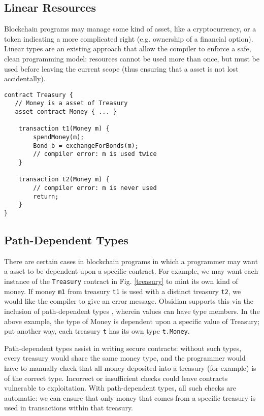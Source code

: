 \documentclass[sigplan,10pt,review]{acmart}\settopmatter{printfolios=true}
\begin{document}
\subsection{Linear Resources}

Blockchain programs may manage some kind of asset, like a cryptocurrency, or a token
indicating a more complicated right (e.g. ownership of a financial option). Linear types \cite{Wadler} are an existing approach that allow the compiler to
enforce a safe, clean programming model: resources cannot be used more than once, but must be 
used before leaving the current scope (thus ensuring that a asset is not lost accidentally).

\begin{lstlisting}[caption={Linear resources in Obsidian}, captionpos = b, label = treasury]
contract Treasury {
   // Money is a asset of Treasury
   asset contract Money { ... }

    transaction t1(Money m) {
        spendMoney(m);
        Bond b = exchangeForBonds(m);
        // compiler error: m is used twice
    }

    transaction t2(Money m) {
        // compiler error: m is never used
        return;
    }
}
\end{lstlisting}

\subsection{Path-Dependent Types}

There are certain cases in blockchain programs in which a programmer may want a asset to
be dependent upon a specific contract. For example, we may want each instance of the 
\texttt{\small{Treasury}} contract in Fig. \ref{treasury} to mint its own kind of money. If money \texttt{\small{m1}} from treasury \texttt{\small{t1}} is used with a distinct treasury \texttt{\small{t2}}, we would like the compiler to give an error message. Obsidian supports this via the inclusion of path-dependent types \cite{Amin}, wherein values can have type members. In the 
above example, the type of Money is dependent upon a specific value of Treasury; put another way, 
each treasury \texttt{\small{t}} has its own type \texttt{\small{t.Money}}. 

Path-dependent types assist in writing secure contracts: without such types, every
treasury would share the same money type, and the programmer would have to manually check 
that all money deposited into a treasury (for example) is of the correct type. Incorrect or insufficient 
checks could leave contracts vulnerable to exploitation. With path-dependent types, all such checks 
are automatic: we can ensure that only money that comes from a specific treasury is used in 
transactions within that treasury. 
\end{document}

